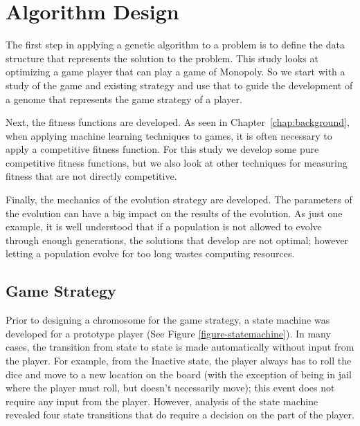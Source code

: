 \clearpage
\chapter{Algorithm Design} \label{chap:algorithm}

The first step in applying a genetic algorithm to a problem is to define the
data structure that represents the solution to the problem. This study looks at
optimizing a game player that can play a game of Monopoly. So we start with a
study of the game and existing strategy and use that to guide the development of
a genome that represents the game strategy of a player.

Next, the fitness functions are developed. As seen in
Chapter~\ref{chap:background}, when applying machine learning techniques to
games, it is often necessary to apply a competitive fitness function. For this
study we develop some pure competitive fitness functions, but we also look at
other techniques for measuring fitness that are not directly competitive.

Finally, the mechanics of the evolution strategy are developed. The parameters
of the evolution can have a big impact on the results of the evolution. As just
one example, it is well understood that if a population is not allowed to evolve
through enough generations, the solutions that develop are not optimal; however
letting a population evolve for too long wastes computing resources.  

\section{Game Strategy} \label{5_strategy}

Prior to designing a chromosome for the game strategy, a state machine was
developed for a prototype player (See Figure \ref{figure-statemachine}). In many
cases, the transition from state to state is made automatically without input
from the player. For example, from the Inactive state, the player always has to
roll the dice and move to a new location on the board (with the exception of
being in jail where the player must roll, but doesn't necessarily move); this
event does not require any input from the player. However, analysis of the state
machine revealed four state transitions that do require a decision on the part
of the player.

